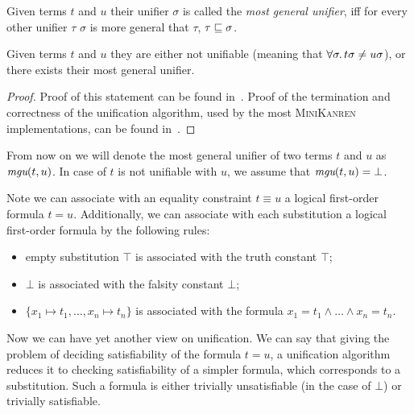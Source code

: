 \begin{definition}
  \label{def:mgu}
  Given terms $t$ and $u$ their unifier $\sigma$ is called the
  \emph{most general unifier}, 
  iff for every other unifier $\tau$
  $\sigma$ is more general that $\tau$, $\tau \sqsubseteq \sigma$.
\end{definition}

\begin{theorem}
  \label{lemma:unify}
  Given terms $t$ and $u$ they are either not unifiable 
  (meaning that $\forall \sigma\ldotp {t}{\sigma} \neq {u}{\sigma}$),
  or there exists their most general unifier.
\end{theorem}

\begin{proof}
  Proof of this statement can be found in~\cite{robinson1965machine}.
  Proof of the termination and correctness of the unification algorithm,
  used by the most \textsc{MiniKanren} implementations,
  can be found in~\cite{kumar2010nominal}.
\end{proof}

From now on we will denote the most general unifier
of two terms $t$ and $u$ as $\textit{mgu}(t, u)$.
In case of $t$ is not unifiable with $u$,
we assume that $\textit{mgu}(t, u) = \bot$.

\begin{remark}
  Note we can associate with an 
  equality constraint $t \equiv u$ a
  logical first-order formula $t = u$.
  Additionally, we can associate with each substitution a logical first-order formula
  by the following rules:
  \begin{itemize}
    \item empty substitution $\top$ is associated with the truth constant $\top$;
    \item $\bot$ is associated with the falsity constant $\bot$;
    \item $\{x_1 \mapsto t_1, \dots, x_n \mapsto t_n\}$ is associated with 
          the formula $x_1 = t_1 \wedge \dots \wedge x_n = t_n$.
  \end{itemize}
  Now we can have yet another view on unification.
  We can say that giving the problem of deciding satisfiability
  of the formula $t = u$, a unification algorithm reduces it 
  to checking satisfiability of a simpler formula,
  which corresponds to a substitution. 
  Such a formula is either trivially unsatisfiable 
  (in the case of $\bot$) or trivially satisfiable.
\end{remark}

